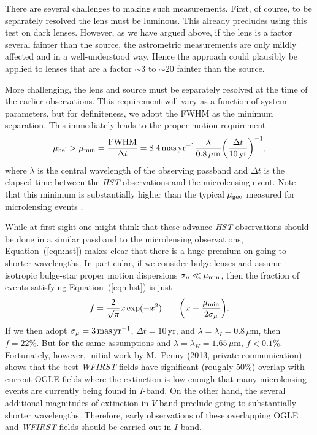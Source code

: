 \documentclass[12pt,preprint]{aastex}
\def\masyr{{\rm mas}\,{\rm yr}^{-1}}
\def\geo{{\rm geo}}
\def\hel{{\rm hel}}
\def\fwhm{{\rm FWHM}}
\begin{document}
There are several challenges to making such measurements.  First, of
course, to be separately resolved the lens must be luminous.  This
already precludes using this test on dark lenses.  However, as we have
argued above, if the lens is a factor several fainter than the source,
the astrometric measurements are only mildly affected and in a well-understood
way.  Hence the approach could plausibly be applied to lenses that are a
factor $\sim 3$ to $\sim 20$ fainter than the source.

More challenging, the lens and source must be separately resolved at the time
of the earlier observations.  This requirement will vary as a function of
system parameters, but for definiteness, we adopt the FWHM as the minimum
separation.  This immediately leads to the proper motion requirement
\begin{equation}
\mu_\hel > \mu_{\rm min} = {\fwhm\over \Delta t} = 8.4\,\masyr
{\lambda\over 0.8\,\mu{\rm m}}\biggl({\Delta t\over 10\,{\rm yr}}\biggr)^{-1},
\label{eqn:hst}
\end{equation}
where $\lambda$ is the central wavelength of the observing passband and
$\Delta t$ is the elapsed time between the {\it HST} observations and
the microlensing event.  Note that this minimum is substantially
higher than the typical $\mu_\geo$ measured for microlensing events
\citep{henderson14}.

While at first sight one might think that these advance {\it HST} 
observations should be done in a similar passband to the microlensing 
observations, Equation~(\ref{eqn:hst}) makes clear that there is a 
huge premium on going to shorter wavelengths.  In particular, if
we consider bulge lenses and assume isotropic bulge-star
proper motion dispersions
$\sigma_\mu \ll \mu_{\rm min}$, then the fraction of events satisfying
Equation~(\ref{eqn:hst}) is just
\begin{equation}
f = {2\over\sqrt{\pi}} x\exp(-x^2)
\qquad \biggl(x\equiv {\mu_{\rm min}\over 2\sigma_\mu}\biggr).
\label{eqn:fval}
\end{equation}
If we then adopt $\sigma_\mu=3\,\masyr$, $\Delta t=10\,$yr, 
and $\lambda=\lambda_I=0.8\,\mu$m, then $f= 22\%$.  
But for the same assumptions and $\lambda=\lambda_H=1.65\,\mu$m, 
$f< 0.1\%$.  Fortunately, however, initial work by M.\ Penny (2013,
private communication) shows that the best {\it WFIRST} fields 
have significant (roughly 50\%) overlap with current OGLE fields where the
extinction is low enough that many microlensing events are currently
being found in $I$-band.  On the other hand, the several additional
magnitudes of extinction in $V$ band preclude going to substantially
shorter wavelengths.  Therefore, early observations of these overlapping
OGLE and  {\it WFIRST} fields should be carried out in $I$ band.
\end{document}
